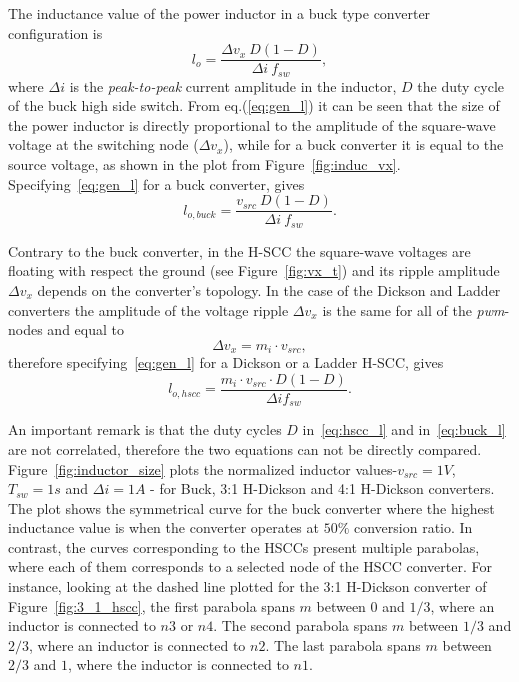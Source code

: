The inductance value of the power inductor in a buck type converter configuration is
\begin{equation}
 l_{o}   = \frac{\Delta v_{x} ~ D (1-D)}{\Delta i ~ f_{sw}},
\label{eq:gen_l}
\end{equation}
where $\Delta i$ is the \emph{peak-to-peak} current amplitude in the inductor, $D$ the duty cycle of the buck high side switch. From eq.(\ref{eq:gen_l}) it can be seen that the size of the power inductor is directly proportional to the amplitude of the square-wave voltage at the switching node ($\Delta v_x$), while for a buck converter it is equal to the source voltage, as shown in the plot from Figure~\ref{fig:induc_vx}. Specifying~\eqref{eq:gen_l} for a buck converter, gives
\begin{equation}
 l_{o,buck}  = \frac{v_{src} ~ D(1-D)}{\Delta i ~ f_{sw} }.
\label{eq:buck_l}
\end{equation}

Contrary to the buck converter, in the H-SCC the square-wave voltages are floating with respect the ground (see Figure~\ref{fig:vx_t}) and its ripple amplitude $\Delta v_x$ depends on the converter's topology. In the case of the Dickson and Ladder converters the amplitude of the voltage ripple $\Delta v_x$ is the same for all of the \emph{pwm}-nodes and equal to
\begin{equation}
 \Delta v_x   = m_i \cdot v_{src},
\label{eq:h_scc_Del_vx}
\end{equation}
therefore specifying~\eqref{eq:gen_l} for a Dickson or a Ladder H-SCC, gives
\begin{equation}
 l_{o,hscc}  = \frac{ m_i \cdot v_{src} \cdot D (1-D)}{\Delta i f_{sw} }.
\label{eq:hscc_l}
\end{equation}


An important remark is that the duty cycles $D$ in~\eqref{eq:hscc_l} and in~\eqref{eq:buck_l} are not correlated, therefore the two equations can not be directly compared.  Figure~\ref{fig:inductor_size} plots the normalized inductor values-$v_{src} = 1V$, $T_{sw}=1s$ and $\Delta i = 1A$ - for Buck, 3:1 H-Dickson and 4:1 H-Dickson converters. The plot shows the symmetrical curve for the buck converter where the highest inductance value is when the converter operates at $50\%$ conversion ratio.
In contrast, the curves corresponding to the HSCCs present multiple parabolas, where each of them corresponds to a selected node of the HSCC converter. For instance, looking at the dashed line plotted for the 3:1 H-Dickson converter of Figure~\ref{fig:3_1_hscc}, the first parabola spans $m$ between $0$ and $1/3$, where an inductor is connected to $n3$ or $n4$. The second parabola spans $m$ between $1/3$ and $2/3$, where an inductor is connected to $n2$. The last parabola spans $m$ between $2/3$ and $1$, where the inductor is connected to $n1$.

